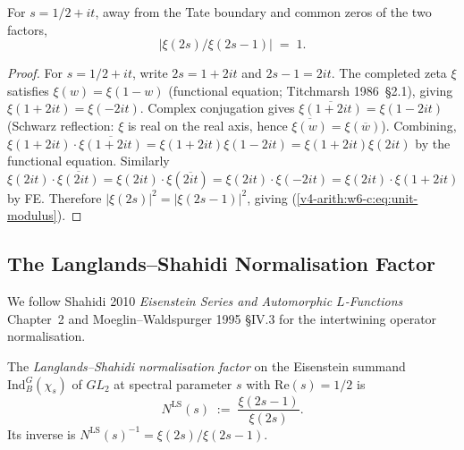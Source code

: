 \begin{lemma}
\label{v4-arith:w6-c:lem:unit-modulus}
For \(s=1/2+it\), away from the Tate boundary
and common zeros of the two factors,
\begin{equation}
\label{v4-arith:w6-c:eq:unit-modulus}
\bigl|\xi(2s)/\xi(2s-1)\bigr|\;=\;1.
\end{equation}
\end{lemma}

\begin{proof}
For \(s=1/2+it\), write \(2s=1+2it\) and \(2s-1=2it\). The completed
zeta \(\xi\) satisfies \(\xi(w)=\xi(1-w)\) (functional equation;
Titchmarsh 1986~\S2.1), giving \(\xi(1+2it)=\xi(-2it)\). Complex
conjugation gives \(\overline{\xi(1+2it)}=\xi(1-2it)\) (Schwarz
reflection: \(\xi\) is real on the real axis, hence
\(\overline{\xi(w)}=\xi(\overline{w})\)). Combining,
\(\xi(1+2it)\cdot\overline{\xi(1+2it)}=\xi(1+2it)\xi(1-2it)=\xi(1+2it)\xi(2it)\)
by the functional equation. Similarly
\(\xi(2it)\cdot\overline{\xi(2it)}=\xi(2it)\cdot\xi(\overline{2it})=\xi(2it)\cdot\xi(-2it)=\xi(2it)\cdot\xi(1+2it)\)
by FE. Therefore \(|\xi(2s)|^{2}=|\xi(2s-1)|^{2}\), giving
(\ref{v4-arith:w6-c:eq:unit-modulus}).
\end{proof}

\subsection{The Langlands--Shahidi Normalisation Factor}
\label{v4-arith:w6-c:LS:factor-def}

We follow Shahidi 2010 \emph{Eisenstein Series and Automorphic
\(L\)-Functions} Chapter~2 and Moeglin--Waldspurger 1995 \S IV.3 for
the intertwining operator normalisation.

\begin{definition}
\label{v4-arith:w6-c:def:LS-factor}
The \emph{Langlands--Shahidi normalisation factor} on the
Eisenstein summand \(\mathrm{Ind}_{B}^{G}(\chi_{s})\) of \(GL_{2}\) at
spectral parameter \(s\) with \(\mathrm{Re}(s)=1/2\) is
\begin{equation}
\label{v4-arith:w6-c:eq:LS-factor}
N^{\mathrm{LS}}(s)\;:=\;\frac{\xi(2s-1)}{\xi(2s)}.
\end{equation}
Its inverse is
\(N^{\mathrm{LS}}(s)^{-1}=\xi(2s)/\xi(2s-1)\).
\end{definition}

